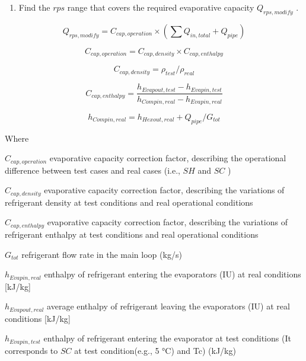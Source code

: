 \begin{enumerate}
\def\labelenumi{\alph{enumi}.}
\setcounter{enumi}{1}
\tightlist
\item
  Find the \(rps\) range that covers the required evaporative capacity \(Q_{rps,modify}\) .
\end{enumerate}

\begin{equation}
Q_{rps,modify} = C_{cap,operation}\times(\sum{Q_{in,total}}+Q_{pipe})
\end{equation}

\begin{equation}
C_{cap,operation} = C_{cap,density}\times{C_{cap,enthalpy}}
\end{equation}

\begin{equation}
C_{cap,density} = \rho_{test}/\rho_{real}
\end{equation}

\begin{equation}
C_{cap,enthalpy} = \frac{h_{Evapout,test}-h_{Evapin,test}}{h_{Compin,real}-h_{Evapin,real}}
\end{equation}

\begin{equation}
h_{Compin,real} = h_{Hexout,real}+Q_{pipe}/G_{tot}
\end{equation}

Where

\(C_{cap,operation}\) evaporative capacity correction factor, describing the operational difference between test cases and real cases (i.e., \(SH\) and \(SC\) )

\(C_{cap,density}\) evaporative capacity correction factor, describing the variations of refrigerant density at test conditions and real operational conditions

\(C_{cap,enthalpy}\) evaporative capacity correction factor, describing the variations of refrigerant enthalpy at test conditions and real operational conditions

\(G_{tot}\) refrigerant flow rate in the main loop (kg/s)

\(h_{Evapin,real}\) enthalpy of refrigerant entering the evaporators (IU) at real conditions {[}kJ/kg{]}

\(h_{Evapout,real}\) average enthalpy of refrigerant leaving the evaporators (IU) at real conditions {[}kJ/kg{]}

\(h_{Evapin,test}\) enthalpy of refrigerant entering the evaporator at test conditions (It corresponds to \(SC\) at test condition(e.g., 5 °C) and Tc) (kJ/kg)

